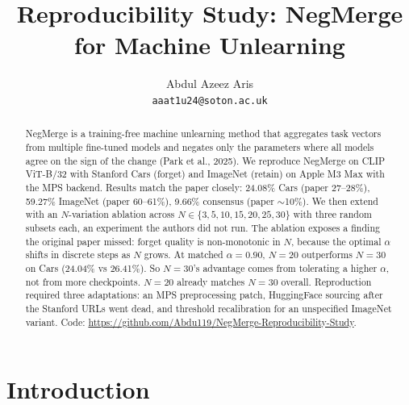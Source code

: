\documentclass{article}
\title{Reproducibility Study: NegMerge for Machine Unlearning}
\author{Abdul Azeez Aris \\
\texttt{aaat1u24@soton.ac.uk}}
\begin{document}
\maketitle

\begin{abstract}
NegMerge is a training-free machine unlearning method that aggregates task vectors from multiple fine-tuned models and negates only the parameters where all models agree on the sign of the change (Park et al., 2025). We reproduce NegMerge on CLIP ViT-B/32 with Stanford Cars (forget) and ImageNet (retain) on Apple M3 Max with the MPS backend. Results match the paper closely: 24.08\% Cars (paper 27--28\%), 59.27\% ImageNet (paper 60--61\%), 9.66\% consensus (paper $\sim$10\%). We then extend with an $N$-variation ablation across $N \in \{3, 5, 10, 15, 20, 25, 30\}$ with three random subsets each, an experiment the authors did not run. The ablation exposes a finding the original paper missed: forget quality is non-monotonic in $N$, because the optimal $\alpha$ shifts in discrete steps as $N$ grows. At matched $\alpha = 0.90$, $N = 20$ outperforms $N = 30$ on Cars (24.04\% vs 26.41\%). So $N = 30$'s advantage comes from tolerating a higher $\alpha$, not from more checkpoints. $N = 20$ already matches $N = 30$ overall. Reproduction required three adaptations: an MPS preprocessing patch, HuggingFace sourcing after the Stanford URLs went dead, and threshold recalibration for an unspecified ImageNet variant. Code: \url{https://github.com/Abdu119/NegMerge-Reproducibility-Study}.
\end{abstract}

\section{Introduction}
\end{document}
